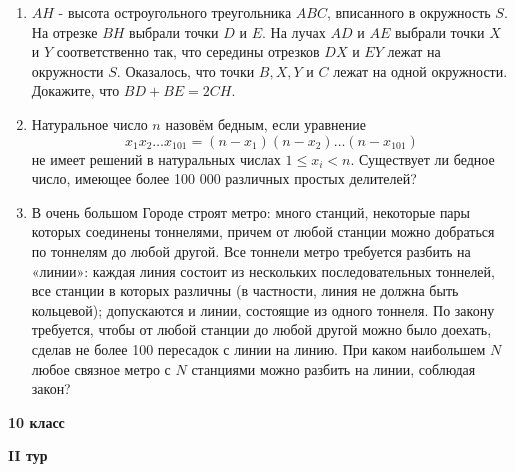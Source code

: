 \documentclass{article}
\begin{document}
\begin{enumerate}[label*=\textbf{\arabic{enumi}.}]
\newpage

\item $AH$ - высота остроугольного треугольника $ABC$, вписанного в окружность $S$. На отрезке $BH$ выбрали точки $D$ и $E$. На лучах $AD$ и $AE$ выбрали точки $X$ и $Y$ соответственно так, что середины отрезков $DX$ и $EY$ лежат на окружности $S$. Оказалось, что точки $B, X, Y$ и $C$ лежат на одной окружности. Докажите, что $BD + BE = 2CH.$

\item Натуральное число $n$ назовём бедным, если уравнение
$$x_1x_2\dotsc x_{101} = (n-x_1)(n-x_2)\dotsc (n-x_{101})$$
не имеет решений в натуральных числах $1 \leqslant x_i < n$. Существует ли бедное число, имеющее более 100 000 различных простых делителей?

\item В очень большом Городе строят метро: много станций, некоторые пары которых соединены тоннелями, причем от любой станции можно добраться по тоннелям до любой другой. Все тоннели метро требуется разбить на «линии»: каждая линия состоит из нескольких последовательных тоннелей, все станции в которых различны (в частности, линия не должна быть кольцевой); допускаются и линии, состоящие из одного тоннеля. По закону требуется, чтобы от любой станции до любой другой можно было доехать, сделав не более 100 пересадок с линии на линию. При каком наибольшем $N$ любое связное метро с $N$ станциями можно разбить на линии, соблюдая закон?
\end{enumerate}
\newpage


\begin{center}
	\LARGE\textbf{10 класс}
\end{center}
\begin{center}
	\large\textbf{II тур}
\end{center}
\end{document}
